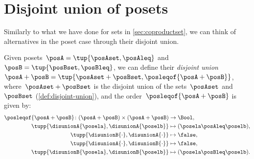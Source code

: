 
\section{Disjoint union of posets}
Similarly to what we have done for sets in \cref{sec:coproductset}, we can think of alternatives in the poset case through their disjoint union.

\begin{definition}
    Given posets~$\posA=\tup{\posAset, \posAleq}$ and~$\posB=\tup{\posBset, \posBleq}$, we can define their \emph{disjoint union}~$\posA+\posB=\tup{\posAset + \posBset, \posleqof{\posA + \posB}}$, where~$\posAset + \posBset$ is the disjoint union of the sets~$\posAset$ and~$\posBset$ (\cref{def:disjoint-union}), and the order~$\posleqof{\posA + \posB}$ is given by:
    \begin{equation}
        \begin{aligned}
            \posleqof{\posA+\posB}\colon (\posA+\posB)\times (\posA+\posB) & \to \Bool, \\
            \tupp{\disunionA{\posela},\disunionA{\poselb} }                &
            \mapsto (\posela\posAleq \poselb),                                          \\
            \tupp{\disunionB{\cdot},\disunionA{\cdot} }                    &
            \mapsto \false,                                                             \\
            \tupp{\disunionA{\cdot},\disunionB{\cdot}}                     &
            \mapsto \false,                                                             \\
            \tupp{\disunionB{\posela},\disunionB{\poselb}}                 &
            \mapsto (\posela\posBleq \poselb).
        \end{aligned}
    \end{equation}
\end{definition}

